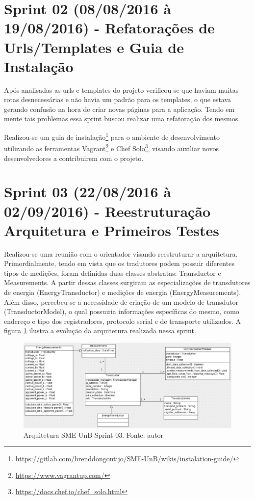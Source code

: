 \vfill
\pagebreak

\section{Sprint 02 (08/08/2016 à 19/08/2016) - Refatorações de Urls/Templates e Guia de Instalação}
Após analisadas as urls e templates do projeto verificou-se que haviam muitas rotas desnecessárias e não havia um padrão para os templates, o que estava gerando confusão na hora de criar novas páginas para a aplicação. Tendo em mente tais problemas essa sprint buscou realizar uma refatoração dos mesmos.

Realizou-se um guia de instalação\footnote{\url{https://gitlab.com/brenddongontijo/SME-UnB/wikis/instalation-guide/}} para o ambiente de desenvolvimento utilizando as ferramentas Vagrant\footnote{\url{https://www.vagrantup.com/}} e Chef Solo\footnote{\url{https://docs.chef.io/chef_solo.html}}, visando auxiliar novos desenvolvedores a contribuirem com o projeto.

\section{Sprint 03 (22/08/2016 à 02/09/2016) - Reestruturação Arquitetura e Primeiros Testes}
Realizou-se uma reunião com o orientador visando reestruturar a arquitetura. Primordialmente, tendo em vista que os tradutores podem possuir diferentes tipos de medições, foram definidas duas classes abstratas: Transductor e Measurements. A partir dessas classes surgiram as especializações de transdutores de energia (EnergyTransductor) e medições de energia (EnergyMeasurements). Além disso, percebeu-se a necessidade de criação de um modelo de transdutor (TransductorModel), o qual possuiria informações específicas do mesmo, como endereço e tipo dos registradores, protocolo serial e de transporte utilizados. A figura \ref{sprint03arq} ilustra a evolução da arquitetura realizada nessa sprint.

\begin{figure}[!htpb]
    \centering
    \includegraphics[scale=0.6,angle=90]{figuras/sprint03arq.eps}
    \caption{Arquitetura SME-UnB Sprint 03. Fonte: autor}
    \label{sprint03arq}
\end{figure}

